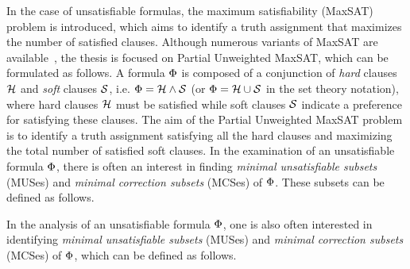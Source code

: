 In the case of unsatisfiable formulas,  the maximum satisfiability (MaxSAT) problem is introduced,
which aims to identify a truth assignment that maximizes the number of satisfied clauses.
%
Although numerous variants of MaxSAT are available~\cite[Chapters~23~and~24]{sat-handbook}, 
the thesis is focused on Partial Unweighted MaxSAT, which can be formulated as follows.
%
A formula $\Phi$ is composed of a conjunction of \emph{hard} clauses ${\mathcal{H}}$ and 
\emph{soft} clauses ${\mathcal{S}}$, i.e. $\Phi={\mathcal{H}}\land{\mathcal{S}}$ (or $\Phi={\mathcal{H}}\cup{\mathcal{S}}$ in the set
theory notation), where hard clauses ${\mathcal{H}}$ must be satisfied 
while soft clauses  ${\mathcal{S}}$ indicate a preference for satisfying these clauses. 
%
The aim of the Partial Unweighted MaxSAT problem is to identify a 
truth assignment satisfying all the hard clauses and maximizing the total number of 
satisfied soft clauses.
%
In the examination of an unsatisfiable formula $\Phi$, there is often an interest in 
finding \emph{minimal unsatisfiable subsets} (MUSes) and \emph{minimal correction subsets} (MCSes) of $\Phi$. 
%
These subsets can be defined as follows.

In the analysis of an unsatisfiable formula $\Phi$, one is also often
interested in identifying \emph{minimal unsatisfiable subsets} (MUSes) and
\emph{minimal correction subsets} (MCSes) of $\Phi$, which can be defined as
follows.

